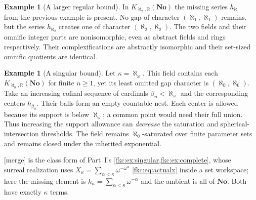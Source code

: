 \documentclass[11pt,letterpaper]{article}
\numberwithin{equation}{section}
\theoremstyle{definition}
\newtheorem{example}[theorem]{Example}
\theoremstyle{remark}
\newcommand{\R}{\mathbb R}
\newcommand{\No}{\mathbf{No}}
\newcommand{\mergetag}{\textup{\textsf{\small[merge]}}}%
\newcommand{\KN}[2]{K_{#1,#2}(\No)}%
\begin{document}
\begin{example}[A larger regular bound]\label{fkc:sb:ex:regular}
In $\KN{\aleph_2}\R$ the missing series $h_{\aleph_1}$ from the previous example is present. No gap of character $(\aleph_1,\aleph_1)$ remains, but the series $h_{\aleph_2}$ creates one of character $(\aleph_2,\aleph_2)$. The two fields and their omnific integer parts are nonisomorphic, even as abstract fields and rings respectively. Their complexifications are abstractly isomorphic and their set-sized omnific quotients are identical.
\end{example}

\begin{example}[A singular bound]\label{fkc:sb:ex:singular}
Let $\kappa=\aleph_\omega$. This field contains each $\KN{\aleph_n}\R$ for finite $n\ge1$, yet its least omitted gap character is $(\aleph_0,\aleph_0)$. Take an increasing cofinal sequence of cardinals $\beta_n<\aleph_\omega$ and the corresponding centers $h_{\beta_n}$. Their balls form an empty countable nest. Each center is allowed because its support is below $\aleph_\omega$; a common point would need their full union. Thus increasing the support allowance can \emph{decrease} the saturation and spherical-intersection thresholds. The field remains $\aleph_0$-saturated over finite parameter sets and remains closed under the inherited exponential.
\end{example}
\mergetag{}  is the class form of Part~I's \cref{fkc:ex:singular,fkc:ex:complete}, whose surreal realization uses $X_\kappa=\sum_{\alpha<\kappa}\omega^{-\omega^\alpha}$ \eqref{fkc:eq:actualx} inside a set workspace; here the missing element is $h_\kappa=\sum_{\alpha<\kappa}\omega^{-\alpha}$ and the ambient is all of $\No$. Both have exactly $\kappa$ terms.
\end{document}
